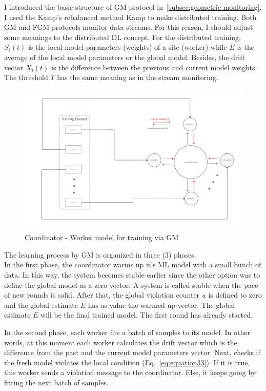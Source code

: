 I introduced the basic structure of GM protocol in~\ref{subsec:geometric-monitoring}.
I used the Kamp's rebalanced method Kamp to make distributed training.
Both GM and FGM protocols monitor data streams.
For this reason, I should adjust some meanings to the distributed DL concept.
For the distributed training, $S_i(t)$ is the local model parameters (weights) of a site (worker) while $E$ is the average of the local model parameters or the global model.
Besides, the drift vector $X_i(t)$ is the difference between the previous and current model weights.
The threshold $T$ has the same meaning as in the stream monitoring.

\vspace{2cm}

\begin{figure}[H]
    \centering
    \includegraphics[scale=.125]{./images/impl/arch-gm.png}
    \caption{Coordinator - Worker model for training via GM}
    \label{fig:arch-gm}
\end{figure}

\newpage

The learning process by GM is organized in three (3) phases. \\
In the first phase, the coordinator warms up it's ML model with a small bunch of data.
In this way, the system becomes stable earlier since the other option was to define the global model as a zero vector.
A system is called stable when the pace of new rounds is solid.
After that, the global violation counter $u$ is defined to zero and the global estimate $E$ has as value the warmed up vector.
The global estimate $E$ will be the final trained model.
The first round has already started.

In the second phase, each worker fits a batch of samples to its model.
In other words, at this moment each worker calculates the drift vector which is the difference from the past and the current model parameters vector.
Next, checks if the fresh model violates the local condition (Eq.~\ref{eq:equation33}).
If it is true, this worker sends a violation message to the coordinator.
Else, it keeps going by fitting the next batch of samples.

